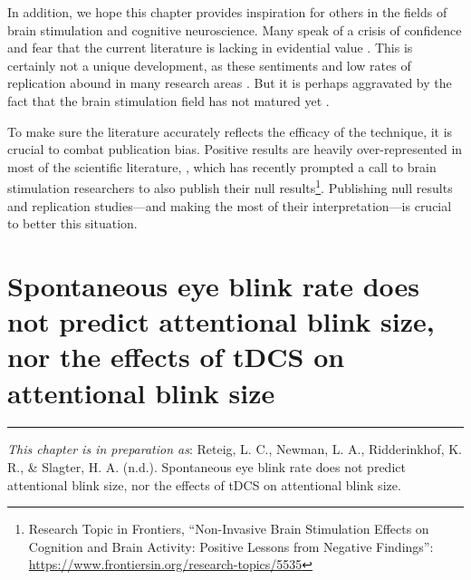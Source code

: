 \documentclass[11pt,english,]{memoir}
\let\rmarkdownfootnote\footnote%
\def\footnote{\protect\rmarkdownfootnote}
\begin{document}
In addition, we hope this chapter provides inspiration for others in the fields of brain stimulation and cognitive neuroscience. Many speak of a crisis of confidence \autocite{Heroux2017} and fear that the current literature is lacking in evidential value \autocite{Medina2017}. This is certainly not a unique development, as these sentiments \autocite{Baker2015} and low rates of replication abound in many research areas \autocites{OSC2015}{Camerer2018}{Klein2018}. But it is perhaps aggravated by the fact that the brain stimulation field has not matured yet \autocite{Parkin2015}.

To make sure the literature accurately reflects the efficacy of the technique, it is crucial to combat publication bias. Positive results are heavily over-represented in most of the scientific literature, \autocites{Ferguson2012}{Franco2014}{Fanelli2012}, which has recently prompted a call to brain stimulation researchers to also publish their null results\footnote{Research Topic in Frontiers, ``Non-Invasive Brain Stimulation Effects on Cognition and Brain Activity: Positive Lessons from Negative Findings'': \url{https://www.frontiersin.org/research-topics/5535}}. Publishing null results and replication studies---and making the most of their interpretation---is crucial to better this situation.

\hypertarget{AB-tDCS-sEBR}{%
\chapter{Spontaneous eye blink rate does not predict attentional blink size, nor the effects of tDCS on attentional blink size}\label{AB-tDCS-sEBR}}


\vspace*{\fill}

\begin{center}\rule{0.5\linewidth}{\linethickness}\end{center}

\small

\noindent
\emph{This chapter is in preparation as}: Reteig, L. C., Newman, L. A., Ridderinkhof, K. R., \& Slagter, H. A. (n.d.). Spontaneous eye blink rate does not predict attentional blink size, nor the effects of tDCS on attentional blink size.
\newpage
\normalsize
\end{document}
